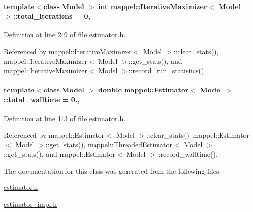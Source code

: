 \paragraph[{\texorpdfstring{total\+\_\+iterations}{total_iterations}}]{\setlength{\rightskip}{0pt plus 5cm}template$<$class Model $>$ int {\bf mappel\+::\+Iterative\+Maximizer}$<$ Model $>$\+::total\+\_\+iterations = 0\hspace{0.3cm}{\ttfamily [protected]}, {\ttfamily [inherited]}}\hypertarget{classmappel_1_1IterativeMaximizer_a8d344b09841e61cc726dc430d8451044}{}\label{classmappel_1_1IterativeMaximizer_a8d344b09841e61cc726dc430d8451044}


Definition at line 249 of file estimator.\+h.



Referenced by mappel\+::\+Iterative\+Maximizer$<$ Model $>$\+::clear\+\_\+stats(), mappel\+::\+Iterative\+Maximizer$<$ Model $>$\+::get\+\_\+stats(), and mappel\+::\+Iterative\+Maximizer$<$ Model $>$\+::record\+\_\+run\+\_\+statistics().

\paragraph[{\texorpdfstring{total\+\_\+walltime}{total_walltime}}]{\setlength{\rightskip}{0pt plus 5cm}template$<$class Model $>$ double {\bf mappel\+::\+Estimator}$<$ Model $>$\+::total\+\_\+walltime = 0.\hspace{0.3cm}{\ttfamily [protected]}, {\ttfamily [inherited]}}\hypertarget{classmappel_1_1Estimator_a5a408458a111c5222193871fa6bb6644}{}\label{classmappel_1_1Estimator_a5a408458a111c5222193871fa6bb6644}


Definition at line 113 of file estimator.\+h.



Referenced by mappel\+::\+Estimator$<$ Model $>$\+::clear\+\_\+stats(), mappel\+::\+Estimator$<$ Model $>$\+::get\+\_\+stats(), mappel\+::\+Threaded\+Estimator$<$ Model $>$\+::get\+\_\+stats(), and mappel\+::\+Estimator$<$ Model $>$\+::record\+\_\+walltime().



The documentation for this class was generated from the following files\+:\begin{DoxyCompactItemize}
\item 
\hyperlink{estimator_8h}{estimator.\+h}\item 
\hyperlink{estimator__impl_8h}{estimator\+\_\+impl.\+h}\end{DoxyCompactItemize}

